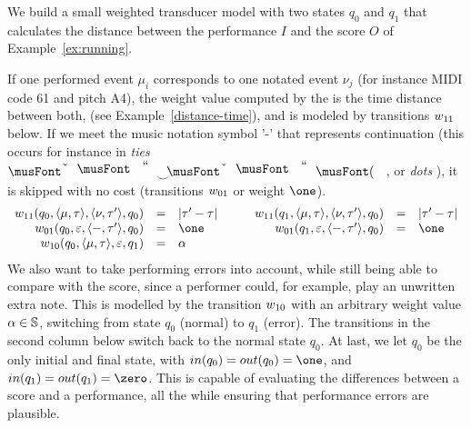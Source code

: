 \begin{example}\label{ex:SWT}
We build a small weighted transducer model
with two states $q_0$ and $q_1$ that
calculates the distance between the performance $I$ and
the score $O$ of Example~\ref{ex:running}.

If one performed event $\mu_i$  corresponds
to one notated event $\nu_j$ (for instance MIDI code 61 and pitch A4),
the weight value computed by the \SWT is the time distance between both,
(see Example~\ref{distance-time}), and is modeled by
transitions $\wei_{11}$ below.
%
If we meet the music notation symbol '-' that
represents continuation (this occurs for instance in \emph{ties}
$\musQuarter\!\!\!\mathrel{\raisebox{-1.5mm}{$\smile$}}\!\!\!\musEighth$,
or \emph{dots} \musQuarterDotted{}), it is  skipped with no cost (transitions $\wei_{01}$ or weight $\one$).
\[
\begin{array}{rclcrcl}
\wei_{11}(q_0, \<\mu, \tau>, \<\nu, \tau'>, q_0) & = & |\tau' - \tau| & \quad &
\wei_{11}(q_1, \<\mu, \tau>, \<\nu, \tau'>, q_0) & = & |\tau' - \tau|\\
\wei_{01}(q_0, \varepsilon, \< \mathsf{-}, \tau'>, q_0) & = & \one & &
\wei_{01}(q_1, \varepsilon, \< \mathsf{-}, \tau'>, q_0) & = & \one\\
\wei_{10}(q_0, \<\mu, \tau>, \varepsilon, q_1) & = & \alpha & & %
\end{array}
\]
%
We also want to take performing errors into account, while still being able to compare with the score,
since a performer could, for example, play an unwritten extra note.
%
This is modelled by the transition $\wei_{10}$ with an arbitrary weight value $\alpha \in \mathbb{S}$,
switching from state $q_0$ (normal) to $q_1$ (error).
The transitions in the second column below switch back to the normal state $q_0$.
At last, we let $q_0$ be the only initial and final state, with
$\init(q_0) = \final(q_0) = \one$, and
$\init(q_1) = \final(q_1) = \zero$.
This \SWT is capable of evaluating the differences between a score and a performance,
all the while ensuring that performance errors are plausible.
\endex
\end{example}

